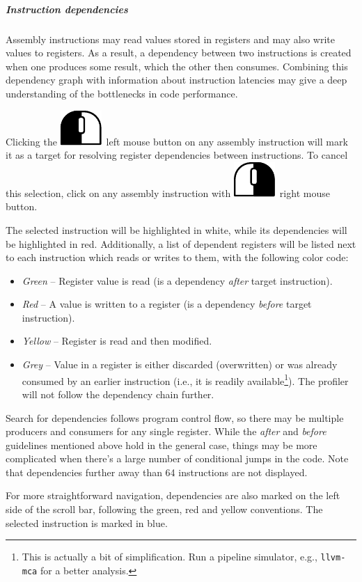 \documentclass[hidelinks,titlepage,a4paper]{article}
\newcommand{\LMB}{\includegraphics[height=.8\baselineskip]{icons/lmb}}
\newcommand{\RMB}{\includegraphics[height=.8\baselineskip]{icons/rmb}}
\begin{document}
\subparagraph{Instruction dependencies}

Assembly instructions may read values stored in registers and may also write values to registers. As a result, a dependency between two instructions is created when one produces some result, which the other then consumes. Combining this dependency graph with information about instruction latencies may give a deep understanding of the bottlenecks in code performance.

Clicking the \LMB{}~left mouse button on any assembly instruction will mark it as a target for resolving register dependencies between instructions. To cancel this selection, click on any assembly instruction with \RMB{}~right mouse button.

The selected instruction will be highlighted in white, while its dependencies will be highlighted in red. Additionally, a list of dependent registers will be listed next to each instruction which reads or writes to them, with the following color code:

\begin{itemize}
\item \emph{Green} -- Register value is read (is a dependency \emph{after} target instruction).
\item \emph{Red} -- A value is written to a register (is a dependency \emph{before} target instruction).
\item \emph{Yellow} -- Register is read and then modified.
\item \emph{Grey} -- Value in a register is either discarded (overwritten) or was already consumed by an earlier instruction (i.e., it is readily available\footnote{This is actually a bit of simplification. Run a pipeline simulator, e.g., \texttt{llvm-mca} for a better analysis.}). The profiler will not follow the dependency chain further.
\end{itemize}

Search for dependencies follows program control flow, so there may be multiple producers and consumers for any single register. While the \emph{after} and \emph{before} guidelines mentioned above hold in the general case, things may be more complicated when there's a large number of conditional jumps in the code. Note that dependencies further away than 64 instructions are not displayed.

For more straightforward navigation, dependencies are also marked on the left side of the scroll bar, following the green, red and yellow conventions. The selected instruction is marked in blue.
\end{document}
